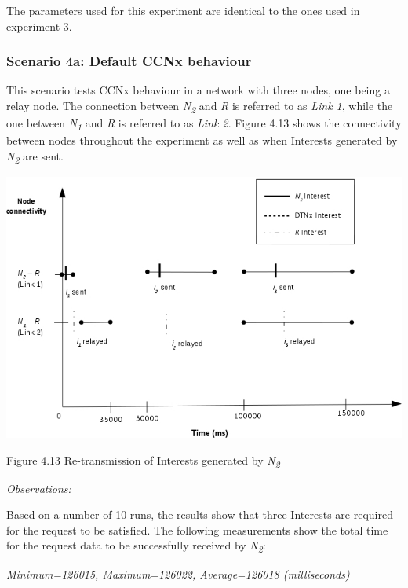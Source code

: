 \documentclass[a4paper,12pt]{report}      %
\begin{document}
\noindent The parameters used for this experiment are identical to the ones used in experiment 3.

\subsubsection{Scenario 4a: Default CCNx behaviour}

This scenario tests CCNx behaviour in a network with three nodes, one being a relay node. The connection between \emph{N\textsubscript{2}} and \emph{R} is referred to as \emph{Link 1}, while the one between \emph{N\textsubscript{1}} and \emph{R} is referred to as \emph{Link 2}. Figure 4.13 shows the connectivity between nodes throughout the experiment as well as when Interests generated by \emph{N\textsubscript{2}} are sent.

\noindent\includegraphics[scale=0.55]{exp4a_timediag.jpg}\newline
\begin{center}Figure 4.13 Re-transmission of Interests generated by \emph{N\textsubscript{2}}\end{center} 

\vspace*{1\baselineskip}\noindent\emph{Observations:}

Based on a number of 10 runs, the results show that three Interests are required for the request to be
satisfied. The following measurements show the total time for the request data to be successfully
received by \emph{N\textsubscript{2}}:

\begin{center}\textsl{Minimum=126015, Maximum=126022, Average=126018 (milliseconds)}\end{center}
\end{document}
